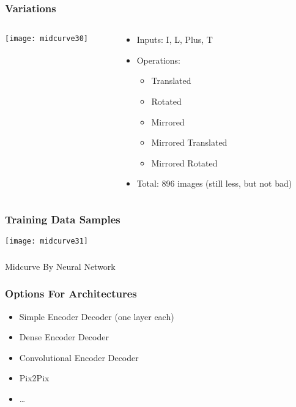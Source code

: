 \begin{frame}[fragile]\frametitle{Variations}

  \begin{columns}[t]
    \begin{column}[T]{0.4\linewidth}
      \centering
      \texttt{[image: midcurve30]}
    \end{column}
    \begin{column}[T]{0.6\linewidth}
	\begin{itemize}
	\item Inputs: I, L, Plus, T
	\item Operations:
	\begin{itemize}
		\item Translated
		\item Rotated
		\item Mirrored
		\item Mirrored Translated
		\item Mirrored Rotated
	\end{itemize}
	\item Total: 896 images (still less, but not bad)
	\end{itemize}
    \end{column}
  \end{columns}
  \end{frame}
  
\begin{frame}[fragile]\frametitle{Training Data Samples}

\begin{center}
\texttt{[image: midcurve31]}
\end{center}	
\end{frame}

\begin{frame}[fragile]\frametitle{}
\begin{center}
{\Large Midcurve By Neural Network}
\end{center}
\end{frame}

\begin{frame}[fragile]\frametitle{Options For Architectures}
	\begin{itemize}
	\item Simple Encoder Decoder (one layer each)
	\item Dense Encoder Decoder
	\item Convolutional Encoder Decoder
	\item Pix2Pix
	\item \ldots
	\end{itemize}	
\end{frame}


